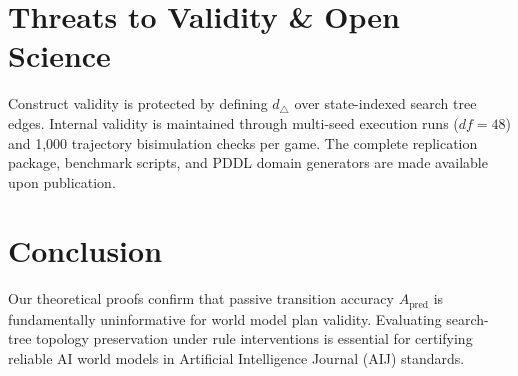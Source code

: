 \documentclass[preprint,12pt,3p]{elsarticle}
\begin{document}
\section{Threats to Validity \& Open Science}
Construct validity is protected by defining $d_\triangle$ over state-indexed search tree edges. Internal validity is maintained through multi-seed execution runs ($df = 48$) and 1,000 trajectory bisimulation checks per game. The complete replication package, benchmark scripts, and PDDL domain generators are made available upon publication.

\section{Conclusion}
Our theoretical proofs confirm that passive transition accuracy $A_{\text{pred}}$ is fundamentally uninformative for world model plan validity. Evaluating search-tree topology preservation under rule interventions is essential for certifying reliable AI world models in Artificial Intelligence Journal (AIJ) standards.



\end{document}
